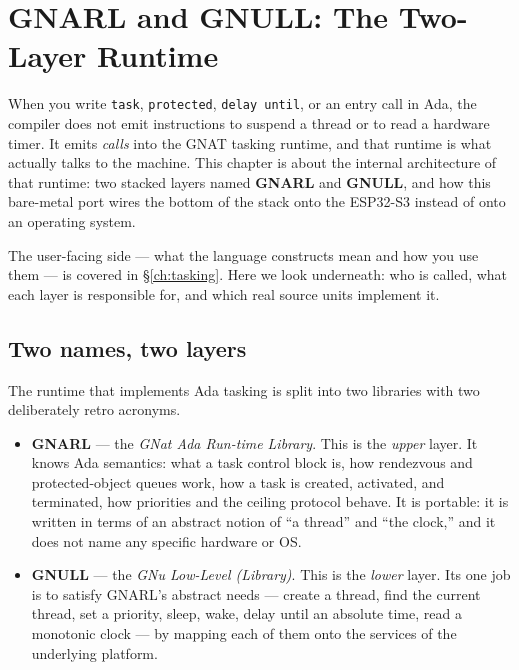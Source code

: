 \chapter{GNARL and GNULL: The Two-Layer Runtime}
\label{ch:gnarl-gnull}

When you write \texttt{task}, \texttt{protected}, \texttt{delay until}, or an entry
call in Ada, the compiler does not emit instructions to suspend a thread or to
read a hardware timer. It emits \emph{calls} into the GNAT tasking runtime, and
that runtime is what actually talks to the machine. This chapter is about the
internal architecture of that runtime: two stacked layers named \textbf{GNARL}
and \textbf{GNULL}, and how this bare-metal port wires the bottom of the stack
onto the ESP32-S3 instead of onto an operating system.

The user-facing side --- what the language constructs mean and how you use them
--- is covered in \S\ref{ch:tasking}. Here we look underneath: who is called,
what each layer is responsible for, and which real source units implement it.

\section{Two names, two layers}

The runtime that implements Ada tasking is split into two libraries with two
deliberately retro acronyms.

\begin{itemize}
  \item \textbf{GNARL} --- the \emph{GNat Ada Run-time Library}. This is the
        \emph{upper} layer. It knows Ada semantics: what a task control block is,
        how rendezvous and protected-object queues work, how a task is created,
        activated, and terminated, how priorities and the ceiling protocol
        behave. It is portable: it is written in terms of an abstract notion of
        ``a thread'' and ``the clock,'' and it does not name any specific
        hardware or OS.
  \item \textbf{GNULL} --- the \emph{GNu Low-Level (Library)}. This is the
        \emph{lower} layer. Its one job is to satisfy GNARL's abstract needs ---
        create a thread, find the current thread, set a priority, sleep, wake,
        delay until an absolute time, read a monotonic clock --- by mapping each
        of them onto the services of the underlying platform.
\end{itemize}

